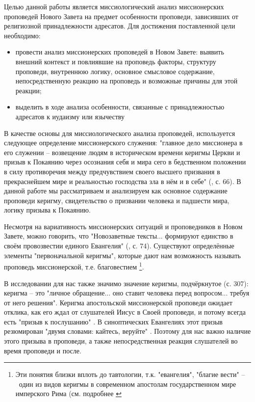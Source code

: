 
\Introduction

Целью данной работы является миссиологический анализ миссионерских проповедей Нового Завета на предмет особенности проповеди, зависивших от религиозной принадлежности адресатов. Для достижения поставленной цели необходимо:

\begin{itemize}
\item провести анализ миссионерских проповедей в Новом Завете: выявить внешний контекст и повлиявшие на проповедь факторы, структуру проповеди, внутреннюю логику, основное смысловое содержание, непосредственную реакцию на проповедь и возможные причины для этой реакции;
\item выделить в ходе анализа особенности, связанные с принадлежностью адресатов к иудаизму или язычеству
\end{itemize}

В качестве основы для миссиологического анализа проповедей, используется следующее определение миссионерского служения: "главное дело миссионера в его служении – возвещение людям в историческом времени керигмы Церкви и призыв к Покаянию через осознания себя и мира сего в бедственном положении в силу противоречия между предчувствием своего высшего призвания в прекраснейшем мире и реальностью господства зла в нём и в себе" (\cite{@ogk.mag.}, с. 66).
В данной работе мы рассматриваем и анализируем как основное содержание проповеди керигму, свидетельство о призвании человека и падшести мира, логику призыва к Покаянию.


Несмотря на вариативность миссионерских ситуаций и проповедников в Новом Завете, можно говорить, что "Новозаветные тексты... формируют единство в своём провозвестии единого Евангелия" (\cite{@dodd.apostolic}, с. 74).
Существуют определённые элементы "первоначальной керигмы", которые дают нам возможность называть проповедь миссионерской, т.е. благовестием \footnote{Эти понятия близки вплоть до тавтологии, т.к. "евангелия", "благие вести" – один из видов керигмы в современном апостолам государственном мире имперского Рима (см. подробнее \cite{@via.kerigma}}.


В исследовании для нас также значимо значение керигмы, подчёркнутое \cite{@bultman.theology_1} (с. 307): керигма – это "личное обращение... оно ставит человека перед вопросом... требуя от него решения".
Керигма апостольской миссионерской проповеди ожидает отклика, как его ждал от слушателей Иисус в Своей проповеди, и потому всегда есть "призыв к послушанию" \cite{@via.kerigma}.
В синоптических Евангелиях этот призыв резюмирован "двумя словами: кайтесь, веруйте" \cite{@dunn.edinstvo}.
Поэтому для нас важно наличие этого призыва в проповеди, а также непосредственная реакция слушателей во время проповеди и после.


